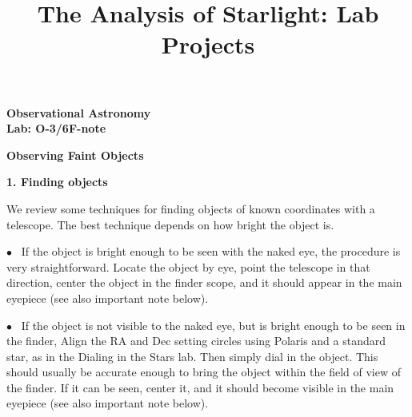 \documentclass[12pt]{article}
\title{The Analysis of Starlight: Lab Projects}
\begin{document}
\setcounter{page}{1}
\setcounter{equation}{0}
\pagestyle{plain}
\thispagestyle{empty}  %
\newcommand{\kms}{\hbox{km\,s$^{\rm -1}$}}
\def\lo {\ifmmode {\,{\it L}\solar} \else $\,L$\solar\fi}       %
\def\my {\ifmmode {\,{\it M}\solar\,{\rm yr^{-1}}}              %
        \else {$\,M$\solar$\,$yr$^{\rm -1}$}\fi}
\def\BD {BD$\,$+30{\degr}3639}
\def\HUNO{\rm H$\,$I}                   %
\def\HDOS{\rm H$_2$}                    %
\def\arcsec{\ifmmode {^{\scriptscriptstyle\prime\prime}}
          \else $^{\scriptscriptstyle\prime\prime}$\fi}
\def\arcmin{\ifmmode {^{\scriptscriptstyle\prime}}
          \else $^{\scriptscriptstyle\prime}$\fi}
\def\deg{\ifmmode^\circ\else$^\circ$\fi}

\sloppy




\noindent
{\bf Observational Astronomy    \hfill}\\
{\bf Lab: O-3/6F-note} 


\bigskip

\medskip

\noindent
{\hfill \Large {\bf Observing Faint Objects} \hfill}


\bigskip

\noindent
{\bf 1. Finding objects}

\medskip
\noindent
We review some techniques for finding objects of known
coordinates with a telescope. The best technique depends on how bright
the object is.

\medskip\noindent $\bullet$ \ If the object is bright enough to be seen with
the naked eye, the procedure is very straightforward. Locate the object
by eye, point the telescope in that direction, center the object in the
finder scope, and it should appear in the main eyepiece (see also important
note below).

\medskip\noindent  $\bullet$ \ If the object is not visible to the
naked eye, but is bright enough to be seen in the finder, 
Align the RA and Dec setting circles using
Polaris and a standard star, as in the Dialing in the Stars lab. Then
simply dial in the object. This should
usually be accurate enough to bring the object within the field of
view of the finder. If it can be seen, center it, and it should become
visible in the main eyepiece (see also important
note below).
\end{document}
